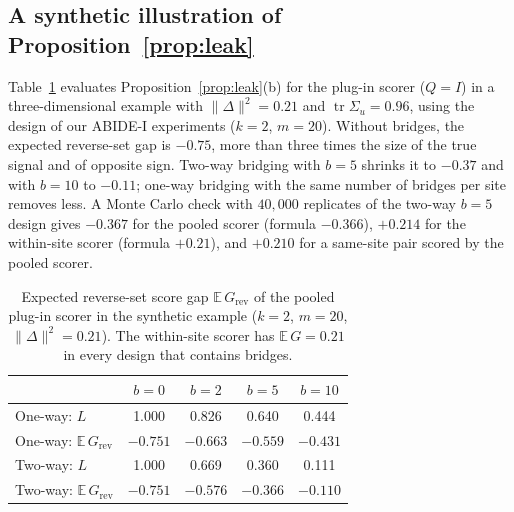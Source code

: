 \subsection{A synthetic illustration of Proposition~\ref{prop:leak}}\label{sec:synthetic}

Table~\ref{tab:synthetic} evaluates Proposition~\ref{prop:leak}(b) for the plug-in scorer ($Q=I$) in a three-dimensional example with $\|\Delta\|^2=0.21$ and $\operatorname{tr}\Sigma_u=0.96$, using the design of our ABIDE-I experiments ($k=2$, $m=20$). Without bridges, the expected reverse-set gap is $-0.75$, more than three times the size of the true signal and of opposite sign. Two-way bridging with $b=5$ shrinks it to $-0.37$ and with $b=10$ to $-0.11$; one-way bridging with the same number of bridges per site removes less. A Monte Carlo check with $40{,}000$ replicates of the two-way $b=5$ design gives $-0.367$ for the pooled scorer (formula $-0.366$), $+0.214$ for the within-site scorer (formula $+0.21$), and $+0.210$ for a same-site pair scored by the pooled scorer.

\begin{table}[t]
\centering
\caption{Expected reverse-set score gap $\mathbb{E}\,G_{\mathrm{rev}}$ of the pooled plug-in scorer in the synthetic example ($k=2$, $m=20$, $\|\Delta\|^2=0.21$). The within-site scorer has $\mathbb{E}\,G=0.21$ in every design that contains bridges.}
\label{tab:synthetic}
\begin{tabular}{lcccc}
\toprule
& $b=0$ & $b=2$ & $b=5$ & $b=10$\\
\midrule
One-way: $L$ & 1.000 & 0.826 & 0.640 & 0.444\\
One-way: $\mathbb{E}\,G_{\mathrm{rev}}$ & $-0.751$ & $-0.663$ & $-0.559$ & $-0.431$\\
Two-way: $L$ & 1.000 & 0.669 & 0.360 & 0.111\\
Two-way: $\mathbb{E}\,G_{\mathrm{rev}}$ & $-0.751$ & $-0.576$ & $-0.366$ & $-0.110$\\
\bottomrule
\end{tabular}
\end{table}
